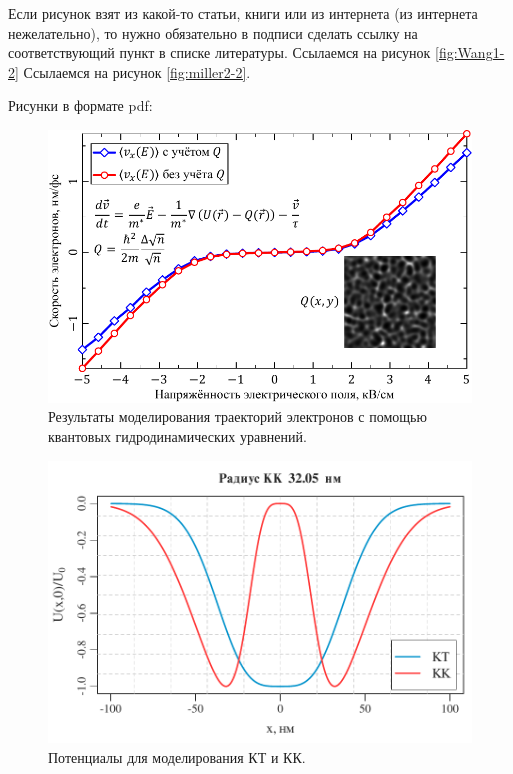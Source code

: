 \documentclass[14pt,oneside]{extarticle}
\begin{document}
Если рисунок взят из какой-то статьи, книги или из интернета (из интернета нежелательно), то нужно обязательно в подписи сделать ссылку на соответствующий пункт в списке литературы.
Ссылаемся на рисунок \ref{fig:Wang1-2}
Ссылаемся на рисунок \ref{fig:miller2-2}.

Рисунки в формате pdf:

\begin{figure}
    \begin{center}
        \includegraphics{images/iv-curve.pdf}
        \caption{\label{fig:iv-curve-1}
            Результаты моделирования траекторий электронов с помощью квантовых гидродинамических уравнений.}
    \end{center}
\end{figure}

\begin{figure}
    \begin{center}
        \includegraphics{images/qd_qr_potential.pdf}
        \caption{\label{fig:qr-potential-1}
            Потенциалы для моделирования КТ и КК.}
    \end{center}
\end{figure}
    
\end{document}
